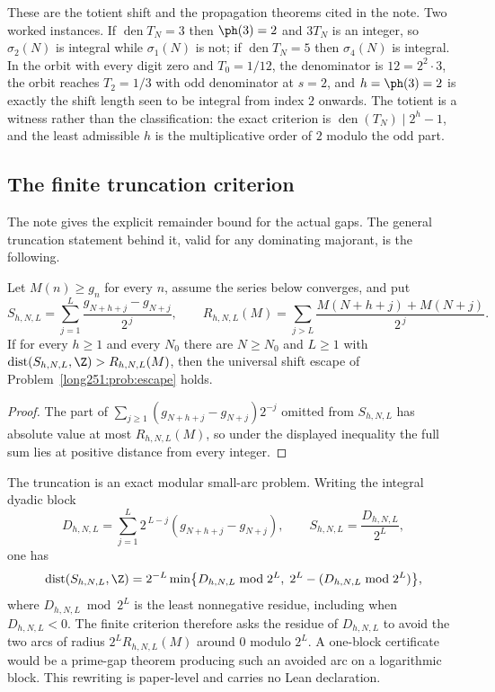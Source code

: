 \noindent These are the totient shift and the propagation theorems cited in the
note.  Two worked instances.  If $\operatorname{den}T_N=3$ then $\ph(3)=2$ and
$3T_N$ is an integer, so $\sigma_2(N)$ is integral while $\sigma_1(N)$ is not;
if $\operatorname{den}T_N=5$ then $\sigma_4(N)$ is integral.  In the orbit with
every digit zero and $T_0=1/12$, the denominator is $12=2^2\cdot3$, the orbit
reaches $T_2=1/3$ with odd denominator at $s=2$, and $h=\ph(3)=2$ is exactly the
shift length seen to be integral from index $2$ onwards.  The totient is a
witness rather than the classification: the exact criterion is
$\operatorname{den}(T_N)\mid2^{h}-1$, and the least admissible $h$ is the
multiplicative order of $2$ modulo the odd part.

\subsection{The finite truncation criterion}\label{long251:sec:xr-truncation}

The note gives the explicit remainder bound for the actual gaps.  The general
truncation statement behind it, valid for any dominating majorant, is the
following.

\begin{proposition}\label{long251:xr:truncation}
Let $M(n)\ge g_n$ for every $n$, assume the series below converges, and put
\[
 S_{h,N,L}=\sum_{j=1}^{L}\frac{g_{N+h+j}-g_{N+j}}{2^{\,j}},\qquad
 R_{h,N,L}(M)=\sum_{j>L}\frac{M(N+h+j)+M(N+j)}{2^{\,j}} .
\]
If for every $h\ge1$ and every $N_0$ there are $N\ge N_0$ and $L\ge1$ with
$\operatorname{dist}(S_{h,N,L},\Z)>R_{h,N,L}(M)$, then the universal shift
escape of Problem~\ref{long251:prob:escape} holds.
\end{proposition}

\begin{proof}
The part of $\sum_{j\ge1}(g_{N+h+j}-g_{N+j})2^{-j}$ omitted from $S_{h,N,L}$
has absolute value at most $R_{h,N,L}(M)$, so under the displayed inequality
the full sum lies at positive distance from every integer.
\end{proof}

The truncation is an exact modular small-arc problem.  Writing the integral
dyadic block
\[
 D_{h,N,L}=\sum_{j=1}^{L}2^{\,L-j}(g_{N+h+j}-g_{N+j}),
 \qquad S_{h,N,L}=\frac{D_{h,N,L}}{2^{L}},
\]
one has
\[
 \operatorname{dist}(S_{h,N,L},\Z)
 =2^{-L}\min\bigl\{D_{h,N,L}\bmod2^{L},\;
 2^{L}-(D_{h,N,L}\bmod2^{L})\bigr\},
\]
where $D_{h,N,L}\bmod2^{L}$ is the least nonnegative residue, including when
$D_{h,N,L}<0$.  The finite criterion therefore asks the residue of
$D_{h,N,L}$ to avoid the two arcs of radius $2^{L}R_{h,N,L}(M)$ around $0$
modulo $2^{L}$.  A one-block certificate would be a prime-gap theorem
producing such an avoided arc on a logarithmic block.  This rewriting is
paper-level and carries no Lean declaration.

